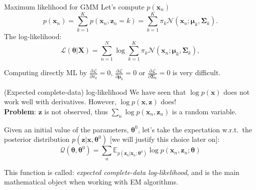 \documentclass[aspectratio=169]{beamer}
\newcommand{\bs}[1]{\boldsymbol{#1}}
\begin{document}
\begin{frame}{Maximum likelihood for GMM}
 Let's compute $p(\bs{x}_n)$
 \[ p(\bs{x}_n) = \sum_{k=1}^K p(\bs{x}_n,\bs{z}_n=k) = \sum_{k=1}^K \pi_k\mathcal{N}(\bs{x}_n;\bs{\mu}_k,\bs{\Sigma}_k).\]
 The log-likelihood:
 \[\mathcal{L}(\bs{\theta}|\bs{X}) = \sum_{n=1}^N \log  \sum_{k=1}^K \pi_k\mathcal{N}(\bs{x}_n;\bs{\mu}_k,\bs{\Sigma}_k),\]

 Computing directly ML by $\displaystyle\frac{\partial\mathcal{L}}{\partial\pi_k}=0$, $\displaystyle\frac{\partial\mathcal{L}}{\partial\bs{\mu}_k}=0$ or $\displaystyle\frac{\partial\mathcal{L}}{\partial\bs{\Sigma}_k}=0$ is very difficult.
\end{frame}


\begin{frame}{(Expected complete-data) log-likelihood}
 We have seen that $\log p(\bs{x})$ does not work well with derivatives. However, $\log p(\bs{x},\bs{z})$ does!\vspace{3mm}\\

 \textbf{Problem}: $\bs{z}$ is not observed, thus $\sum_n\log p(\bs{x}_n,\bs{z}_n)$ is a random variable.\vspace{6mm}\\
 \pause

 Given an initial value of the parameters, $\bs{\theta}^0$, let's take the expectation w.r.t.\ the posterior distribution $p(\bs{z}|\bs{x},\bs{\theta}^0)$ {\footnotesize [we will justify this choice later on]}:
 \[\mathcal{Q}(\bs{\theta},\bs{\theta}^0) = \sum_n \mathbb{E}_{p(\bs{z}_n|\bs{x}_n;\bs{\theta}^0)} \log p(\bs{x}_n,\bs{z}_n;\bs{\theta})\]

 This function is called: \textit{expected complete-data log-likelihood}, and is the main mathematical object when working with EM algorithms.
\end{frame}
\end{document}
